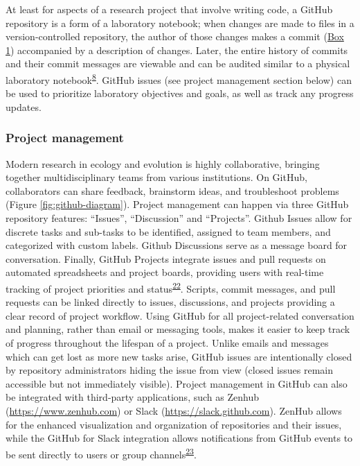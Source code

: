 At least for aspects of a research project that involve writing code, a GitHub repository is a form of a laboratory notebook; when changes are made to files in a version-controlled repository, the author of those changes makes a commit (\protect\hyperlink{definitions}{Box 1}) accompanied by a description of changes.
Later, the entire history of commits and their commit messages are viewable and can be audited similar to a physical laboratory notebook\textsuperscript{\protect\hyperlink{ref-4ny1onB0}{8}}.
GitHub issues (see project management section below) can be used to prioritize laboratory objectives and goals, as well as track any progress updates.

\hypertarget{project-management}{%
\subsubsection{Project management}\label{project-management}}

Modern research in ecology and evolution is highly collaborative, bringing together multidisciplinary teams from various institutions.
On GitHub, collaborators can share feedback, brainstorm ideas, and troubleshoot problems (Figure \ref{fig:github-diagram}).
Project management can happen via three GitHub repository features: ``Issues'', ``Discussion'' and ``Projects''.
Github Issues allow for discrete tasks and sub-tasks to be identified, assigned to team members, and categorized with custom labels.
Github Discussions serve as a message board for conversation.
Finally, GitHub Projects integrate issues and pull requests on automated spreadsheets and project boards, providing users with real-time tracking of project priorities and status\textsuperscript{\protect\hyperlink{ref-RhBKe0MG}{22}}.
Scripts, commit messages, and pull requests can be linked directly to issues, discussions, and projects providing a clear record of project workflow.
Using GitHub for all project-related conversation and planning, rather than email or messaging tools, makes it easier to keep track of progress throughout the lifespan of a project.
Unlike emails and messages which can get lost as more new tasks arise, GitHub issues are intentionally closed by repository administrators hiding the issue from view (closed issues remain accessible but not immediately visible).
Project management in GitHub can also be integrated with third-party applications, such as Zenhub (\url{https://www.zenhub.com}) or Slack (\url{https://slack.github.com}).
ZenHub allows for the enhanced visualization and organization of repositories and their issues, while the GitHub for Slack integration allows notifications from GitHub events to be sent directly to users or group channels\textsuperscript{\protect\hyperlink{ref-1GRWGlDWy}{23}}.

